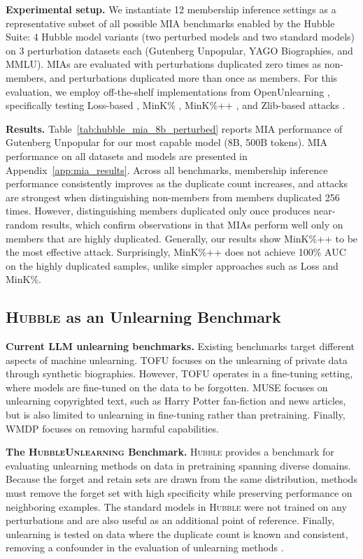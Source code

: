 \textbf{Experimental setup.} We instantiate 12 membership inference settings as a representative subset of all possible MIA benchmarks enabled by the Hubble Suite: 4 Hubble model variants (two perturbed models and two standard models) on 3 perturbation datasets each (Gutenberg Unpopular, YAGO Biographies, and MMLU). MIAs are evaluated with perturbations duplicated zero times as non-members, and perturbations duplicated more than once as members. For this evaluation, we employ off-the-shelf implementations from OpenUnlearning \citep{dorna2025openunlearningacceleratingllmunlearning}, specifically testing Loss-based \citep{LossMIA}, MinK\% \citep{minkMIA}, MinK\%++ \citep{minkplusplusMIA}, and Zlib-based attacks \citep{carlini_extracting_2021}.

\textbf{Results.} Table~\ref{tab:hubble_mia_8b_perturbed} reports MIA performance of Gutenberg Unpopular for our most capable model (8B, 500B tokens). MIA performance on all datasets and models are presented in Appendix~\ref{app:mia_results}. Across all benchmarks, membership inference performance consistently improves as the duplicate count increases, and attacks are strongest when distinguishing non-members from members duplicated 256 times.  However, distinguishing members duplicated only once produces near-random results, which confirm observations in \citet{duan2024membershipinferenceattackswork} that MIAs perform well only on members that are highly duplicated. Generally, our results show MinK\%++ to be the most effective attack. Surprisingly, MinK\%++ does not achieve 100\% AUC on the highly duplicated samples, unlike simpler approaches such as Loss and MinK\%.

\subsection{\textsc{Hubble} as an Unlearning Benchmark}

\textbf{Current LLM unlearning benchmarks.} Existing benchmarks target different aspects of machine unlearning. TOFU \citep{tofu} focuses on the unlearning of private data through  synthetic biographies. However, TOFU operates in a fine-tuning setting, where models are fine-tuned on the data to be forgotten. MUSE \citep{muse} focuses on unlearning copyrighted text, such as Harry Potter fan-fiction and news articles, but is also limited to unlearning in fine-tuning rather than pretraining. Finally, WMDP \citep{wmdp} focuses on removing harmful capabilities.

\textbf{The \textsc{HubbleUnlearning} Benchmark.} \textsc{Hubble} provides a benchmark for evaluating unlearning methods on data in pretraining spanning diverse domains. Because the forget and retain sets are drawn from the same distribution, methods must remove the forget set with high specificity while preserving performance on neighboring examples. The standard models in \textsc{Hubble} were not trained on any perturbations and are also useful as an additional point of reference. Finally, unlearning is tested on data where the duplicate count is known and consistent, removing a confounder in the evaluation of unlearning methods \citep{krishnan2025dataunlearnedequally}.

